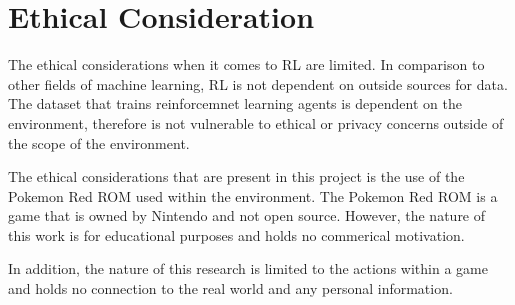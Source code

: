 \section{Ethical Consideration}

The ethical considerations when it comes to RL are limited. In comparison to other fields of machine learning, RL is not dependent on outside sources for data. The dataset that trains reinforcemnet learning agents is dependent on the environment, therefore is not vulnerable to ethical or privacy concerns outside of the scope of the environment. 

The ethical considerations that are present in this project is the use of the Pokemon Red ROM used within the environment. The Pokemon Red ROM is a game that is owned by Nintendo and not open source. However, the nature of this work is for educational purposes and holds no commerical motivation. 

In addition, the nature of this research is limited to the actions within a game and holds no connection to the real world and any personal information. 